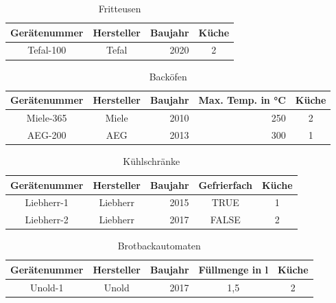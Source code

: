 \begin{table}[!ht]
    \centering
    \begin{tabular}{c|c|c|c}
    \hline
    \rowcolor[HTML]{EFEFEF} 
    \textbf{Gerätenummer} & \textbf{Hersteller} & \textbf{Baujahr} & \textbf{Küche} \\ \hline
    Tefal-100 & Tefal & \multicolumn{1}{r|}{2020} & 2 \\ \hline
    \end{tabular}
    \caption{Fritteusen}
    \label{tab:fritteuse}
\end{table}

\begin{table}[!ht]
    \centering
    \begin{tabular}{c|c|r|r|c}
    \hline
    \rowcolor[HTML]{EFEFEF} 
    \textbf{Gerätenummer} & \textbf{Hersteller} & \multicolumn{1}{c|}{\cellcolor[HTML]{EFEFEF}\textbf{Baujahr}} & \multicolumn{1}{c|}{\cellcolor[HTML]{EFEFEF}\textbf{Max. Temp. in °C}} & \textbf{Küche} \\ \hline
    Miele-365 & Miele & 2010 & 250 & 2 \\
    AEG-200 & AEG & 2013 & 300 & 1 \\ \hline
    \end{tabular}
    \caption{Backöfen}
    \label{tab:backoefen}
\end{table}

\begin{table}[!ht]
    \centering
    \begin{tabular}{c|c|r|c|c}
    \hline
    \rowcolor[HTML]{EFEFEF} 
    \textbf{Gerätenummer} & \textbf{Hersteller} & \multicolumn{1}{c|}{\cellcolor[HTML]{EFEFEF}\textbf{Baujahr}} & \textbf{Gefrierfach} & \textbf{Küche} \\ \hline
    Liebherr-1 & Liebherr & 2015 & TRUE & 1 \\
    Liebherr-2 & Liebherr & 2017 & FALSE & 2 \\ \hline
    \end{tabular}
    \caption{Kühlschränke}
    \label{tab:kuehlschraenke}
\end{table}

\begin{table}[!ht]
    \centering
    \begin{tabular}{c|c|c|c|c}
    \hline
    \rowcolor[HTML]{EFEFEF} 
    \textbf{Gerätenummer} & \textbf{Hersteller} & \textbf{Baujahr} & \textbf{Füllmenge in l} & \textbf{Küche} \\ \hline
    Unold-1 & Unold & \multicolumn{1}{r|}{2017} & 1,5 & 2 \\ \hline
    \end{tabular}
    \caption{Brotbackautomaten}
    \label{tab:brotbackautomaten}
\end{table}

